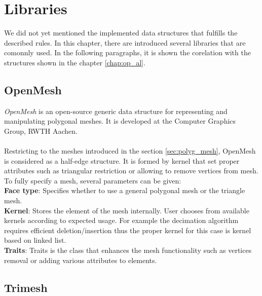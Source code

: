 \chapter{Libraries}

We did not yet mentioned the implemented data structures that fulfills the described rules.
In this chapter, there are introduced several libraries that are comonnly used. In the following paragraphs,
it is shown the corelation with the structures shown in the chapter \ref{chap:op_al}.

\section{OpenMesh}

\emph{OpenMesh}\cite{OMesh}\cite{Botsch2002} is an open-source generic data structure for representing
and manipulating polygonal meshes. It is developed at the Computer Graphics Group, RWTH Aachen.
\\
\\
Restricting to the meshes introduced in the section \ref{sec:polyg_mesh},
OpenMesh is considered as a half-edge structure.
It is formed by kernel that set proper attributes such as triangular restriction or allowing to remove
vertices from mesh.
\\
To fully specify a mesh, several parameters can be given:\\

\textbf{Face type}: Specifies whether to use a general polygonal mesh or the triangle mesh.\\

\textbf{Kernel}: Stores the element of the mesh internally. User chooses from available
kernels according to expected usage. For example the decimation algorithm requires
efficient deletion/insertion thus the proper kernel for this case is kernel based on
linked list.\\

\textbf{Traits}: Traits is the class that enhances the mesh functionality such as
vertices removal or adding various attributes to elements.

\section{Trimesh}

